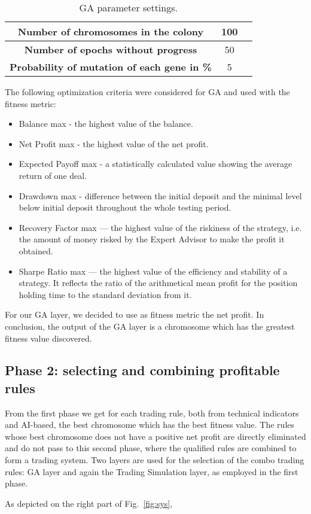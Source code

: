 \begin{table}[htb]
\centering
\begin{tabular}{|c|c|c|}
\hline 
\textbf{Number of chromosomes in the colony} & 100 \\ 
\hline 
\textbf{Number of epochs without progress} &  50\\ 
\hline 
\textbf{Probability of mutation of each gene in \%} &  5\\  
\hline 
\end{tabular} 
\caption{\label{tab:GAPS}GA parameter settings.}
\end{table}


The following optimization criteria were considered for GA and used with the fitness metric:
\begin{itemize}
\setlength\itemsep{0.3em}
\item Balance max - the highest value of the balance.
\item Net Profit max - the highest value of the net profit.
\item Expected Payoff max - a statistically calculated value showing the average return of one deal.
\item Drawdown max - difference between the initial deposit and the minimal level below initial deposit throughout the whole testing period.
\item Recovery Factor max — the highest value of the riskiness of the strategy, i.e. the amount of money risked by the Expert Advisor to make the profit it obtained.
\item Sharpe Ratio max — the highest value of the efficiency and stability of a strategy. It reflects the ratio of the arithmetical mean profit for the position holding time to the standard deviation from it.
\end{itemize}

For our GA layer, we decided to use as fitness metric the net profit.
In conclusion, the output of the GA layer is a chromosome which has the greatest fitness value discovered.

\subsection{Phase 2: selecting and combining profitable rules}
From the first phase we get for each trading rule, both from technical indicators and AI-based, the best chromosome which has the best fitness value. The rules whose best chromosome does not have a positive net profit are directly eliminated and do not pass to this second phase, where the qualified rules are combined to form a trading system. Two layers are used for the selection of the combo trading rules: GA layer and again the Trading Simulation layer, as employed in the first phase.

As depicted on the right part of Fig.~\ref{fig:sys},